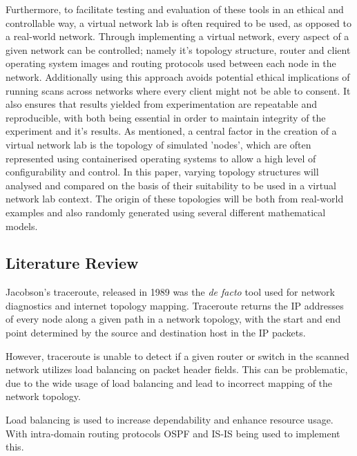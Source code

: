 Furthermore, to facilitate testing and evaluation of these tools in an ethical and controllable way, a virtual network lab is often required to be used, as opposed to a real-world network. Through implementing a virtual network, every aspect of a given network can be controlled; namely it's topology structure, router and client operating system images and routing protocols used between each node in the network. Additionally using this approach avoids potential ethical implications of running scans across networks where every client might not be able to consent. It also ensures that results yielded from experimentation are repeatable and reproducible, with both being essential in order to maintain integrity of the experiment and it's results. As mentioned, a central factor in the creation of a virtual network lab is the topology of simulated 'nodes', which are often represented using containerised operating systems to allow a high level of configurability and control. In this paper, varying topology structures will analysed and compared on the basis of their suitability to be used in a virtual network lab context. The origin of these topologies will be both from real-world examples and also randomly generated using several different mathematical models. 

\subsection{Literature Review}

Jacobson's traceroute, released in 1989 was the \textit{de facto} tool used for network diagnostics and internet topology mapping.
Traceroute returns the IP addresses of every node along a given path in a network topology, with the start and end point determined by the source and destination host in the IP packets.\cite{jacobson1989traceroute}

However, traceroute is unable to detect if a given router or switch in the scanned network utilizes load balancing on packet header fields. This can be problematic, due to the wide usage of load balancing and lead to incorrect mapping of the network topology.\cite{anomalies}\cite{exhaustive}

Load balancing is used to increase dependability and enhance resource usage. With intra-domain routing protocols OSPF\cite{moyospf} and IS-IS\cite{isis} being used to implement this. 

